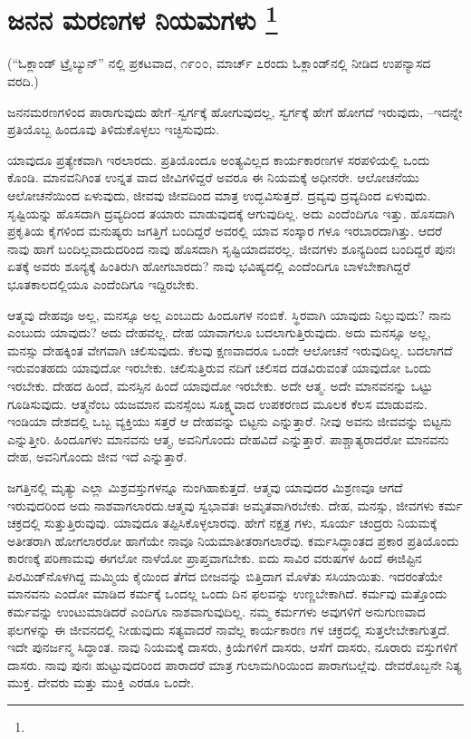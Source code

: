 
\chapter[ಜನನ ಮರಣಗಳ ನಿಯಮಗಳು ]{ಜನನ ಮರಣಗಳ ನಿಯಮಗಳು \protect\footnote{}}

\centerline{(“ಓಕ್ಲಾಂಡ್​ ಟ್ರೈಬ್ಯುನ್​” ನಲ್ಲಿ ಪ್ರಕಟವಾದ, ೧೯೦೦, ಮಾರ್ಚ್​ ೭ರಂದು ಓಕ್ಲಾಂಡ್​ನಲ್ಲಿ ನೀಡಿದ ಉಪನ್ಯಾಸದ ವರದಿ.)}

ಜನನಮರಣಗಳಿಂದ ಪಾರಾಗುವುದು ಹೇಗೆ–ಸ್ವರ್ಗಕ್ಕೆ ಹೋಗುವುದಲ್ಲ, ಸ್ವರ್ಗಕ್ಕೆ ಹೇಗೆ ಹೋಗದೆ ಇರುವುದು, –ಇದನ್ನೇ ಪ್ರತಿಯೊಬ್ಬ ಹಿಂದೂವು ತಿಳಿದುಕೊಳ್ಳಲು ಇಚ್ಛಿಸುವುದು.

ಯಾವುದೂ ಪ್ರತ್ಯೇಕವಾಗಿ ಇರಲಾರದು. ಪ್ರತಿಯೊಂದೂ ಅಂತ್ಯವಿಲ್ಲದ ಕಾರ್ಯಕಾರಣಗಳ ಸರಪಳಿಯಲ್ಲಿ ಒಂದು ಕೊಂಡಿ. ಮಾನವನಿಗಿಂತ ಉನ್ನತ ವಾದ ಜೀವಿಗಳಿದ್ದರೆ ಅವರೂ ಈ ನಿಯಮಕ್ಕೆ ಅಧೀನರೇ. ಆಲೋಚನೆಯು ಆಲೋಚನೆಯಿಂದ ಏಳುವುದು, ಜೀವವು ಜೀವದಿಂದ ಮಾತ್ರ ಉದ್ಭವಿಸುತ್ತದೆ. ದ್ರವ್ಯವು ದ್ರವ್ಯದಿಂದ ಏಳುವುದು. ಸೃಷ್ಟಿಯನ್ನು ಹೊಸದಾಗಿ ದ್ರವ್ಯದಿಂದ ತಯಾರು ಮಾಡುವುದಕ್ಕೆ ಆಗುವುದಿಲ್ಲ. ಅದು ಎಂದೆಂದಿಗೂ ಇತ್ತು. ಹೊಸದಾಗಿ ಪ್ರಕೃತಿಯ ಕೈಗಳಿಂದ ಮನುಷ್ಯರು ಜಗತ್ತಿಗೆ ಬಂದಿದ್ದರೆ ಅವರಲ್ಲಿ ಯಾವ ಸಂಸ್ಕಾರ ಗಳೂ ಇರಬಾರದಾಗಿತ್ತು. ಆದರೆ ನಾವು ಹಾಗೆ ಬಂದಿಲ್ಲವಾದುದರಿಂದ ನಾವು ಹೊಸದಾಗಿ ಸೃಷ್ಟಿಯಾದವರಲ್ಲ. ಜೀವಗಳು ಶೂನ್ಯದಿಂದ ಬಂದಿದ್ದರೆ ಪುನಃ ಏತಕ್ಕೆ ಅವರು ಶೂನ್ಯಕ್ಕೆ ಹಿಂತಿರುಗಿ ಹೋಗಬಾರದು? ನಾವು ಭವಿಷ್ಯದಲ್ಲಿ ಎಂದೆಂದಿಗೂ ಬಾಳಬೇಕಾಗಿದ್ದರೆ ಭೂತಕಾಲದಲ್ಲಿಯೂ ಎಂದೆಂದಿಗೂ ಇದ್ದಿರಬೇಕು.

ಆತ್ಮವು ದೇಹವೂ ಅಲ್ಲ, ಮನಸ್ಸೂ ಅಲ್ಲ ಎಂಬುದು ಹಿಂದೂಗಳ ನಂಬಿಕೆ. ಸ್ಥಿರವಾಗಿ ಯಾವುದು ನಿಲ್ಲುವುದು? ನಾನು ಎಂಬುದು ಯಾವುದು? ಅದು ದೇಹವಲ್ಲ. ದೇಹ ಯಾವಾಗಲೂ ಬದಲಾಗುತ್ತಿರುವುದು. ಅದು ಮನಸ್ಸೂ ಅಲ್ಲ, ಮನಸ್ಸು ದೇಹಕ್ಕಿಂತ ವೇಗವಾಗಿ ಚಲಿಸುವುದು. ಕೆಲವು ಕ್ಷಣವಾದರೂ ಒಂದೇ ಆಲೋಚನೆ ಇರುವುದಿಲ್ಲ. ಬದಲಾಗದೆ ಇರುವಂತಹದು ಯಾವುದೋ ಇರಬೇಕು. ಚಲಿಸುತ್ತಿರುವ ನದಿಗೆ ಚಲಿಸದ ದಡವಿರುವಂತೆ ಯಾವುದೋ ಒಂದು ಇರಬೇಕು. ದೇಹದ ಹಿಂದೆ, ಮನಸ್ಸಿನ ಹಿಂದೆ ಯಾವುದೋ ಇರಬೇಕು. ಅದೇ ಆತ್ಮ. ಅದೇ ಮಾನವನನ್ನು ಒಟ್ಟು ಗೂಡಿಸುವುದು. ಆತ್ಮನೆಂಬ ಯಜಮಾನ ಮನಸ್ಸೆಂಬ ಸೂಕ್ಷ್ಮವಾದ ಉಪಕರಣದ ಮೂಲಕ ಕೆಲಸ ಮಾಡುವನು. ಇಂಡಿಯಾ ದೇಶದಲ್ಲಿ ಒಬ್ಬ ವ್ಯಕ್ತಿಯು ಸತ್ತರೆ ಆ ದೇಹವನ್ನು ಬಿಟ್ಟನು ಎನ್ನುತ್ತಾರೆ. ನೀವು ಅವನು ಜೀವವನ್ನು ಬಿಟ್ಟನು ಎನ್ನುತ್ತೀರಿ. ಹಿಂದೂಗಳು ಮಾನವನು ಆತ್ಮ, ಅವನಿಗೊಂದು ದೇಹವಿದೆ ಎನ್ನುತ್ತಾರೆ. ಪಾಶ್ಚಾತ್ಯರಾದರೋ ಮಾನವನು ದೇಹ, ಅವನಿಗೊಂದು ಜೀವ ಇದೆ ಎನ್ನುತ್ತಾರೆ.

ಜಗತ್ತಿನಲ್ಲಿ ಮೃತ್ಯು ಎಲ್ಲಾ ಮಿಶ್ರವಸ್ತುಗಳನ್ನೂ ನುಂಗಿಹಾಕುತ್ತದೆ. ಆತ್ಮವು ಯಾವುದರ ಮಿಶ್ರಣವೂ ಆಗದೆ ಇರುವುದರಿಂದ ಅದು ನಾಶವಾಗಲಾರದು.ಆತ್ಮವು ಸ್ವಭಾವತಃ ಅಮೃತವಾಗಿರಬೇಕು. ದೇಹ, ಮನಸ್ಸು, ಜೀವಗಳು ಕರ್ಮ ಚಕ್ರದಲ್ಲಿ ಸುತ್ತುತ್ತಿರುವುವು. ಯಾವುದೂ ತಪ್ಪಿಸಿಕೊಳ್ಳಲಾರವು. ಹೇಗೆ ನಕ್ಷತ್ರ ಗಳು, ಸೂರ್ಯ ಚಂದ್ರರು ನಿಯಮಕ್ಕೆ ಅತೀತರಾಗಿ ಹೋಗಲಾರರೋ ಹಾಗೆಯೇ ನಾವೂ ನಿಯಮಾತೀತರಾಗಲಾರೆವು. ಕರ್ಮಸಿದ್ಧಾಂತದ ಪ್ರಕಾರ ಪ್ರತಿಯೊಂದು ಕಾರಣಕ್ಕೆ ಪರಿಣಾಮವು ಈಗಲೋ ನಾಳೆಯೋ ಪ್ರಾಪ್ತವಾಗಬೇಕು. ಐದು ಸಾವಿರ ವರುಷಗಳ ಹಿಂದೆ ಈಜಿಪ್ಟಿನ ಪಿರಮಿಡ್​ನೊಳಗಿದ್ದ ಮಮ್ಮಿಯ ಕೈಯಿಂದ ತೆಗೆದ ಬೀಜವನ್ನು ಬಿತ್ತಿದಾಗ ಮೊಳೆತು ಸಸಿಯಾಯಿತು. ಇದರಂತೆಯೇ ಮಾನವನು ಎಂದೋ ಮಾಡಿದ ಕರ್ಮಕ್ಕೆ ಒಂದಲ್ಲ ಒಂದು ದಿನ ಫಲವನ್ನು ಉಣ್ಣಬೇಕಾಗಿದೆ. ಕರ್ಮವು ಮತ್ತೊಂದು ಕರ್ಮವನ್ನು ಉಂಟುಮಾಡಿದರೆ ಎಂದಿಗೂ ನಾಶವಾಗುವುದಿಲ್ಲ. ನಮ್ಮ ಕರ್ಮಗಳು ಅವುಗಳಿಗೆ ಅನುಗುಣವಾದ ಫಲಗಳನ್ನು ಈ ಜೀವನದಲ್ಲಿ ನೀಡುವುದು ಸತ್ಯವಾದರೆ ನಾವೆಲ್ಲ ಕಾರ್ಯಕಾರಣ ಗಳ ಚಕ್ರದಲ್ಲಿ ಸುತ್ತಲೇಬೇಕಾಗುತ್ತದೆ. ಇದೇ ಪುನರ್ಜನ್ಮ ಸಿದ್ಧಾಂತ. ನಾವು ನಿಯಮಕ್ಕೆ ದಾಸರು, ಕ್ರಿಯೆಗಳಿಗೆ ದಾಸರು, ಆಸೆಗೆ ದಾಸರು, ನೂರಾರು ವಸ್ತುಗಳಿಗೆ ದಾಸರು. ನಾವು ಪುನಃ ಹುಟ್ಟುವುದರಿಂದ ಪಾರಾದರೆ ಮಾತ್ರ ಗುಲಾಮಗಿರಿಯಿಂದ ಪಾರಾಗಬಲ್ಲೆವು. ದೇವರೊಬ್ಬನೇ ನಿತ್ಯ ಮುಕ್ತ. ದೇವರು ಮತ್ತು ಮುಕ್ತಿ ಎರಡೂ ಒಂದೇ.

